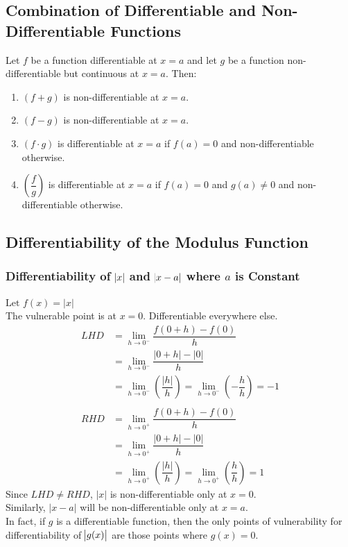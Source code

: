 \documentclass[14]{article}
\theoremstyle{definition}
\theoremstyle{case}
\begin{document}
\subsection{Combination of Differentiable and Non-Differentiable Functions}
Let $f$ be a function differentiable at $x=a$ and let $g$ be a function non-differentiable but continuous at $x=a$. Then:\\
\begin{enumerate}
\item $(f+g)$ is non-differentiable at $x = a$.
\item $(f-g)$ is non-differentiable at $x = a$.
\item $(f\cdot g)$ is differentiable at $x = a$ if $f(a) = 0$ and non-differentiable otherwise.
\item $\left(\dfrac{f}{g} \right)$ is differentiable at $x = a$ if $f(a) = 0$ and $g(a) \neq 0$ and non-differentiable otherwise.
\end{enumerate}
\subsection{Differentiability of the Modulus Function}
\subsubsection{Differentiability of $\abs{x}$ and $\abs{x - a}$ where $a$ is Constant}
$\text{Let }f(x) = \lvert x \rvert$\\
The vulnerable point is at $x = 0$. Differentiable everywhere else.
\begin{align*}
{LHD} &= \lim\limits_{h \to 0^-} \dfrac{f(0+h) - f(0)}{h}\\
&= \lim\limits_{h \to 0^-} \dfrac{\lvert 0 + h \rvert - \lvert 0 \rvert}{h}\\
&= \lim\limits_{h \to 0^-} \left(\dfrac{\lvert h \rvert}{h}\right) =\lim\limits_{h \to 0^-} \left(- \dfrac{h}{h} \right) = -1\\\\
{RHD} &=\lim\limits_{h \to 0^+} \dfrac{f(0+h) - f(0)}{h}\\
&= \lim\limits_{h \to 0^+} \dfrac{\lvert 0 + h \rvert - \lvert 0 \rvert}{h}\\
&= \lim\limits_{h \to 0^+} \left(\dfrac{\lvert h \rvert}{h}\right) =\lim\limits_{h \to 0^+} \left( \dfrac{h}{h} \right) = 1
\end{align*}
Since $LHD \neq RHD$, $|x|$ is non-differentiable only at $x = 0$.\\
Similarly, $\lvert x - a \rvert$ will be non-differentiable only at $x = a$.\\
In fact, if $g$ is a differentiable function, then the only points of vulnerability for differentiability of $\abs{g(x)}$ are those points  where $g(x) = 0$.
\end{document}
